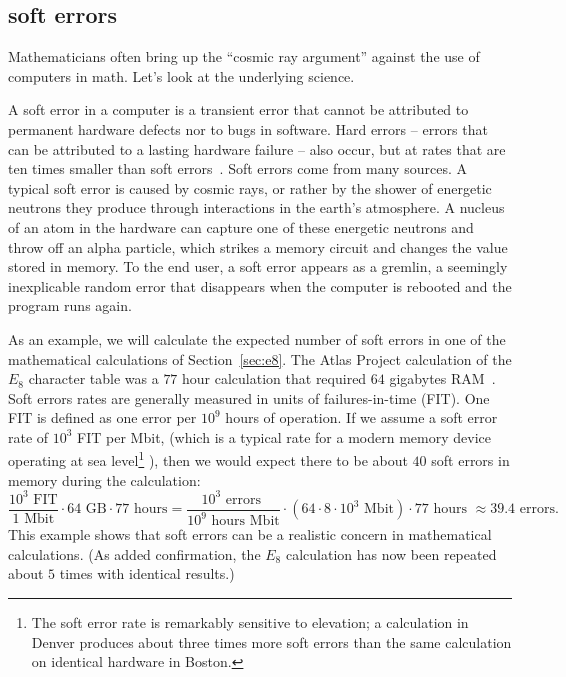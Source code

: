 \documentclass{llncs}
\begin{document}
\subsection{soft errors}\label{sec:soft}

Mathematicians often bring up the ``cosmic ray argument'' against the
use of computers in math.  Let's look at the underlying science.

A soft error in a computer is a transient error that cannot be
attributed to permanent hardware defects nor to bugs in software.
Hard errors -- errors that can be attributed to a lasting hardware
failure -- also occur, but at rates that are ten times smaller than
soft errors~\cite{MW04}.
Soft errors come from many sources. A typical soft error is caused by
cosmic rays, or rather by the shower of energetic neutrons they
produce through interactions in the earth's atmosphere.  A nucleus of
an atom in the hardware can capture one of these energetic neutrons
and throw off an alpha particle, which strikes a memory circuit and
changes the value stored in memory.  To the end user, a soft error
appears as a gremlin, a seemingly inexplicable random error that
disappears when the computer is rebooted and the program runs again.

As an example, we will calculate the expected number of soft errors in
one of the mathematical calculations of Section~\ref{sec:e8}.  The
Atlas Project calculation of the $E_8$ character table was a $77$ hour
calculation that required $64$ gigabytes RAM~\cite{AtlasSlides}.  Soft
errors rates are generally measured in units of failures-in-time
(FIT). One FIT is defined as one error per $10^9$ hours of operation.
If we assume a soft error rate of $10^3$ FIT per Mbit, (which is a
typical rate for a modern memory device operating at sea
level\footnote{The soft error rate is remarkably sensitive to
  elevation; a calculation in Denver produces about three times more
  soft errors than the same calculation on identical hardware in Boston.}
\cite{WP}),
 then we would expect there to be about $40$ soft
errors in memory during the calculation:
\[
\frac{10^3 \text{~FIT}}{1\text{~Mbit}} \cdot 64 \text{~GB} \cdot 77\text{~hours} =
\frac{10^3 \text{~errors~}}{10^9\text{~hours~}\text{Mbit}} \cdot
({64\cdot 8\cdot 10^3 \text{~Mbit}}) \cdot 77\text{~hours~} 
\approx 39.4 \text{~errors}.
\]
This example shows that soft errors can be a realistic concern in
mathematical calculations.  (As added confirmation, the $E_8$
calculation has now been repeated about $5$ times with identical
results.)
\end{document}

